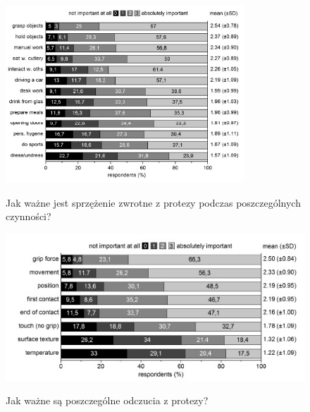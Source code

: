 \documentclass[8pt]{beamer}
\begin{document}
		\begin{frame}
			\begin{center}
				\begin{figure}
					\includegraphics[width=0.8\textwidth]{graphics/activities.jpg}
					\label{graph:feedback2}	
					\caption{Jak ważne jest sprzężenie zwrotne z protezy podczas poszczególnych czynności? \cite{6226669}}
				\end{figure}
			\end{center}
		\end{frame}		
		
		\begin{frame}
			\begin{center}
				\begin{figure}
					\includegraphics[width=\textwidth]{graphics/sensory_info.jpg}
					\label{graph:feedback2}	
					\caption{Jak ważne są poszczególne odczucia z protezy? \cite{6226669}}
				\end{figure}
			\end{center}
		\end{frame}		
		
\end{document}

